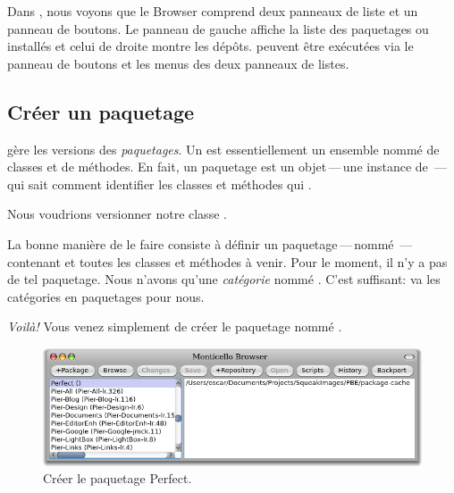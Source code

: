 \documentclass[a4paper,10pt,twoside]{book}
\begin{document}
Dans , nous voyons que le \MC Browser 
comprend deux panneaux de liste et un panneau de boutons. Le panneau
de gauche affiche la liste des paquetages ou  installés
et celui de droite montre les dépôts.
 peuvent être exécutées via le panneau de
boutons et les menus des deux panneaux de listes. %

\subsection{Créer un paquetage}

\MC gère les versions des \emph{paquetages}.  Un  est
essentiellement un ensemble nommé de classes et de méthodes.
En fait, un paquetage est un objet\,---\,une instance de
\,---\,qui sait comment identifier les classes et
méthodes qui .

Nous voudrions versionner notre classe .

La bonne manière de le faire consiste à définir un
paquetage\,---\,nommé \,---\,contenant
 et toutes les classes et méthodes à venir. Pour le
moment, il n'y a pas de tel paquetage. Nous n'avons qu'une
\emph{catégorie} nommé %
. %
C'est suffisant: \MC va  les catégories en
paquetages pour nous.


\emph{Voilà!} Vous venez simplement de créer le paquetage \MC nommé . 

\begin{figure}[ht]\centering
	\includegraphics[width=\textwidth]{perfectPackage}
	\caption{Créer le paquetage Perfect.}
\end{figure}
\end{document}
